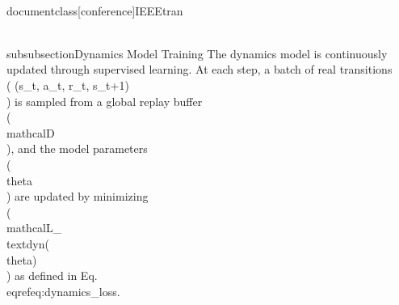 \\documentclass[conference]{IEEEtran}
\begin{document}
\\subsubsection{Dynamics Model Training}
The dynamics model is continuously updated through supervised learning. At each step, a batch of real transitions \\( (s_t, a_t, r_t, s_{t+1}) \\) is sampled from a global replay buffer \\( \\mathcal{D} \\), and the model parameters \\( \\theta \\) are updated by minimizing \\( \\mathcal{L}_{\\text{dyn}}(\\theta) \\) as defined in Eq. \\eqref{eq:dynamics_loss}.
\end{document}

